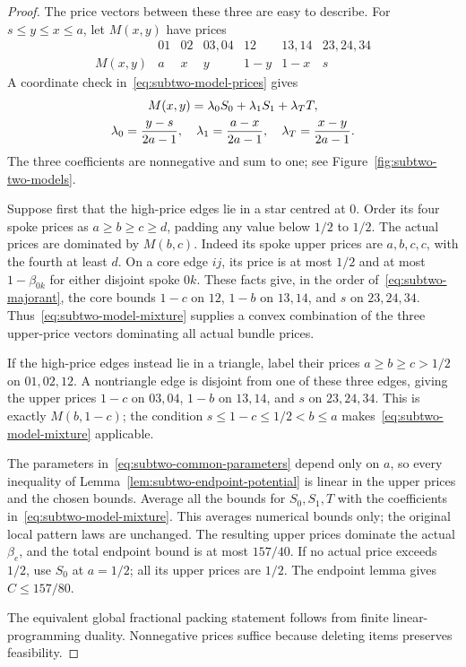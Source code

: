 \documentclass[11pt]{article}
\theoremstyle{definition}\newtheorem{algorithm}{Algorithm}[section]
\numberwithin{equation}{section}
\theoremstyle{remark}\newtheorem*{remark}{Remark}
\begin{document}
\begin{proof}
The price vectors between these three are easy to describe. For
$s\le y\le x\le a$, let $M(x,y)$ have prices
\begin{equation}
\begin{array}{c|cccccc}
 &01&02&03,04&12&13,14&23,24,34\\ \hline
 M(x,y)&a&x&y&1-y&1-x&s
\end{array}                                                       \label{eq:subtwo-majorant}
\end{equation}
A coordinate check in~\eqref{eq:subtwo-model-prices} gives
\begin{equation}
\begin{gathered}
M(x,y)=\lambda_0S_0+\lambda_1S_1+\lambda_TT,\\
 \lambda_0={y-s\over2a-1},\quad
 \lambda_1={a-x\over2a-1},\quad
 \lambda_T={x-y\over2a-1}.
\end{gathered}
\label{eq:subtwo-model-mixture}
\end{equation}
The three coefficients are nonnegative and sum to one;
see Figure~\ref{fig:subtwo-two-models}.

Suppose first that the high-price edges lie in a star centred at
$0$. Order its four spoke prices as
$a\ge b\ge c\ge d$, padding any value below $1/2$ to $1/2$.
The actual prices are dominated by $M(b,c)$. Indeed its spoke
upper prices are $a,b,c,c$, with the fourth at least $d$.
On a core edge $ij$, its price is at most $1/2$ and at most
$1-\beta_{0k}$ for either disjoint spoke $0k$. These facts give,
in the order of~\eqref{eq:subtwo-majorant}, the core bounds
$1-c$ on $12$, $1-b$ on $13,14$, and $s$ on $23,24,34$.
Thus~\eqref{eq:subtwo-model-mixture} supplies a convex combination of the three upper-price vectors dominating all actual bundle prices.

If the high-price edges instead lie in a triangle, label their
prices $a\ge b\ge c>1/2$ on $01,02,12$. A nontriangle edge is
disjoint from one of these three edges, giving the upper prices
$1-c$ on $03,04$, $1-b$ on $13,14$, and $s$ on $23,24,34$.
This is exactly $M(b,1-c)$; the condition
$s\le1-c\le1/2<b\le a$ makes~\eqref{eq:subtwo-model-mixture} applicable.

The parameters in~\eqref{eq:subtwo-common-parameters} depend only on $a$, so every inequality of
Lemma~\ref{lem:subtwo-endpoint-potential} is linear in the upper
prices and the chosen bounds. Average all the bounds for
$S_0,S_1,T$ with the coefficients in~\eqref{eq:subtwo-model-mixture}. This averages numerical bounds only; the original local pattern laws
are unchanged. The resulting upper prices dominate the actual
$\beta_e$, and the total endpoint bound
is at most $157/40$. If no actual price exceeds $1/2$, use
$S_0$ at $a=1/2$; all its upper prices are $1/2$.
The endpoint lemma gives $C\le157/80$.

The equivalent global fractional packing statement follows from
finite linear-programming duality. Nonnegative prices suffice
because deleting items preserves feasibility.
\end{proof}
\end{document}

